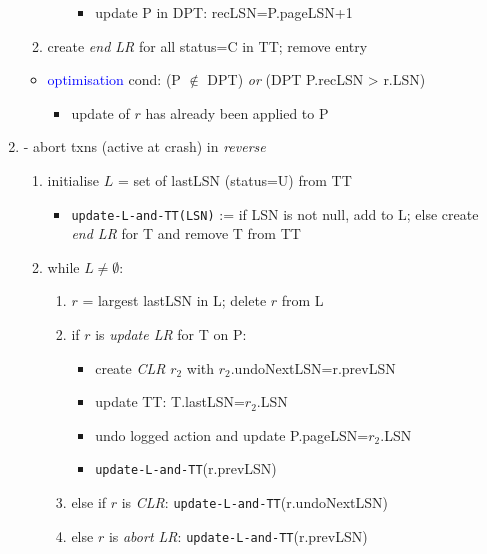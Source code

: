 \documentclass{article}
\begin{document}
\begin{multicols*}{4}
\begin{scriptsize}
\begin{enumerate}
\begin{enumerate}
\begin{enumerate}
              \begin{itemize}
                \item update P in DPT: recLSN=P.pageLSN+1
              \end{itemize}
          \end{enumerate}
        \item create \textit{end LR} for all status=C in TT; remove entry
      \end{enumerate}
      \begin{itemize}
        \item \textcolor{blue}{optimisation} cond: (P $\not\in$ DPT) \textit{or} (DPT P.recLSN > r.LSN)
          \begin{itemize}
            \item update of $r$ has already been applied to P
          \end{itemize}
      \end{itemize}
    \item {} - abort  txns (active at crash) in \textit{reverse}
      \begin{enumerate}
        \item initialise $L$ = set of lastLSN (status=U) from TT
          \begin{itemize}
            \item \texttt{update-L-and-TT(LSN)} := if LSN is not null, add to L; else create \textit{end LR} for T and remove T from TT
          \end{itemize}
        \item while $L \neq \emptyset$:
          \begin{enumerate}
            \item $r$ = largest lastLSN in L; delete $r$ from L
            \item if $r$ is \textit{update LR} for T on P:
              \begin{itemize}
                \item create \textit{CLR} $r_2$ with $r_2$.undoNextLSN=r.prevLSN
                \item update TT: T.lastLSN=$r_2$.LSN
                \item undo logged action and update P.pageLSN=$r_2$.LSN
                \item \texttt{update-L-and-TT}(r.prevLSN)
              \end{itemize}
            \item else if $r$ is \textit{CLR}: \texttt{update-L-and-TT}(r.undoNextLSN)
            \item else $r$ is \textit{abort LR}: \texttt{update-L-and-TT}(r.prevLSN)
          \end{enumerate}
      \end{enumerate}
  \end{enumerate}


\end{scriptsize}
\end{multicols*}
\end{document}
